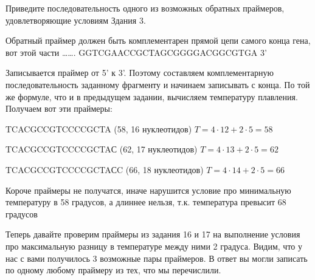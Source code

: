 
Приведите последовательность одного из возможных обратных праймеров, удовлетворяющие условиям Здания 3.

\explanationSection

Обратный праймер должен быть комплементарен прямой цепи самого конца гена, вот этой части \dots \dots. GGTCGAACCGCTAGCGGGGACGGCGTGA 3’

Записывается праймер от 5’ к 3’. Поэтому составляем комплементарную последовательность заданному фрагменту и начинаем записывать с конца. По той же формуле, что и в предыдущем задании, вычисляем температуру плавления. Получаем вот эти праймеры:

TCACGCCGTCCCCGCTA (58, 16 нуклеотидов) $T=4 \cdot 12+2 \cdot 5=58$

TCACGCCGTCCCCGCTAС (62, 17 нуклеотидов) $T=4 \cdot 13+2 \cdot 5=62$

TCACGCCGTCCCCGCTAСC (66, 18 нуклеотидов) $T=4 \cdot 14+2 \cdot 5=66$

Короче праймеры не получатся, иначе нарушится условие про минимальную температуру в 58 градусов, а длиннее нельзя, т.к. температура превысит 68 градусов

Теперь давайте проверим праймеры из задания 16 и 17 на выполнение условия про максимальную разницу в температуре между ними 2 градуса. Видим, что у нас с вами получилось 3 возможные пары праймеров. В ответ вы могли записать по одному любому праймеру из тех, что мы перечислили.

